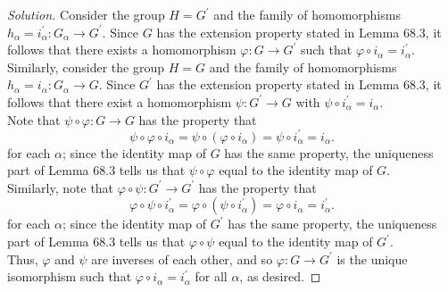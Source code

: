 \documentclass[11pt]{article}
\newenvironment{solution}
  {\renewcommand\qedsymbol{$\blacksquare$}\begin{proof}[Solution]}
  {\end{proof}}
\begin{document}
\begin{solution}
Consider the group $H = G^{\prime}$ and the family of homomorphisms $h_\alpha = i^{\prime}_\alpha \colon G_\alpha \rightarrow G^{\prime}$. Since $G$ has the extension property stated in Lemma 68.3, it follows that 
there exists a homomorphism $\varphi \colon G \rightarrow G^{\prime}$ such that $\varphi \circ i_\alpha = i^{\prime}_\alpha$. \\

Similarly, consider the group $H = G$ and the family of homomorphisms $h_\alpha = i_\alpha \colon G_\alpha \rightarrow G$. Since $G^{\prime}$ has the extension property stated in Lemma 68.3,
it follows that there exist a homomorphism $\psi \colon G^{\prime} \rightarrow G$ with $\psi \circ i^{\prime}_\alpha = i_\alpha$. \\

Note that $\psi \circ \varphi \colon G \rightarrow G$ has the property that 
\[
    \psi \circ \varphi \circ i_\alpha = \psi \circ (\varphi \circ i_\alpha) = \psi \circ i^{\prime}_\alpha = i_\alpha.
\]
for each $\alpha$; since the identity map of $G$ has the same property, the uniqueness part of Lemma 68.3 tells us that $\psi \circ \varphi$ equal to the identity map of $G$. \\

Similarly, note that $\varphi \circ \psi \colon G^{\prime} \rightarrow G^{\prime}$ has the property that 
\[
    \varphi \circ \psi \circ i^{\prime}_\alpha = \varphi \circ (\psi \circ i^{\prime}_\alpha) = \varphi \circ i_\alpha = i^{\prime}_\alpha.
\]
for each $\alpha$; since the identity map of $G^{\prime}$ has the same property, the uniqueness part of Lemma 68.3 tells us that $\varphi \circ \psi$ equal to the identity map of $G^{\prime}$. \\

Thus, $\varphi$ and $\psi$ are inverses of each other, and so $\varphi: G \rightarrow G^{\prime}$ is the unique isomorphism such that $\varphi \circ i_\alpha = i^{\prime}_\alpha$ for all $\alpha$, as desired.
\end{solution}
\end{document}
